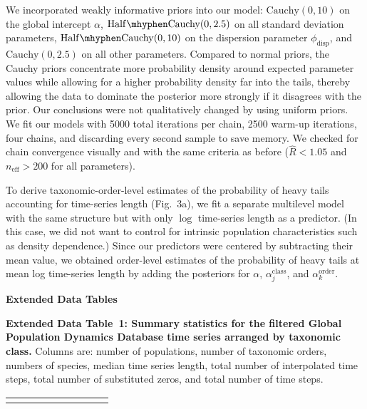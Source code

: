 We incorporated weakly informative priors into our model: \(\mathrm{Cauchy}(0, 10)\) on the global intercept \(\alpha\), \(\mathrm{Half\mhyphen Cauchy}(0, 2.5)\) on all standard deviation parameters, \(\mathrm{Half\mhyphen Cauchy}(0, 10)\) on the dispersion parameter \(\phi_\mathrm{disp}\), and \(\mathrm{Cauchy}(0, 2.5)\) on all other parameters\cite{gelman2006c, gelman2008d}. Compared to normal priors, the Cauchy priors concentrate more probability density around expected parameter values while allowing for a higher probability density far into the tails, thereby allowing the data to dominate the posterior more strongly if it disagrees with the prior. Our conclusions were not qualitatively changed by using uniform priors. We fit our models with 5000 total iterations per chain, 2500 warm-up iterations, four chains, and discarding every second sample to save memory. We checked for chain convergence visually and with the same criteria as before (\(\widehat{R} < 1.05\) and \(n_\mathrm{eff} >200\) for all parameters).

To derive taxonomic-order-level estimates of the probability of heavy tails accounting for time-series length (Fig.~3a), we fit a separate multilevel model with the same structure but with only \(\log\) time-series length as a predictor. (In this case, we did not want to control for intrinsic population characteristics such as density dependence.) Since our predictors were centered by subtracting their mean value, we obtained order-level estimates of the probability of heavy tails at mean log time-series length by adding the posteriors for \(\alpha\), \(\alpha^\mathrm{class}_j\), and \(\alpha^\mathrm{order}_k\).

\clearpage

\textbf{Extended Data Tables}

\newenvironment{helvetica}{\fontfamily{phv}\selectfont}{\par}

\singlespacing

\textbf{Extended Data Table~1: Summary statistics for the filtered Global Population Dynamics Database
time series arranged by taxonomic class.} Columns are: number of populations, number of taxonomic orders, numbers of species, median time series length, total number of interpolated time steps, total number of substituted zeros, and total number of time steps.

\onehalfspacing

\begin{helvetica}
\smallskip
\begin{scriptsize}
\begin{tabular}{lrrrrrrrr}
\toprule

\label{tab:stats}
\end{tabular}
\end{scriptsize}
\end{helvetica}

